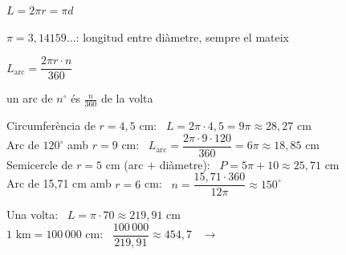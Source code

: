 \documentclass[11pt,a4paper]{article}
\begin{document}
\vfill
\begin{tcbraster}[raster columns=2,raster equal height,raster column skip=10pt]
\begin{tcolorbox}[enhanced,colback=fmyellow!18,colframe=fmgold,arc=4mm,boxrule=1.6pt,before upper=\centering]
{\Large$L=2\pi r=\pi d$}\par\smallskip
{\small $\pi=3{,}14159\dots$: longitud entre diàmetre, sempre el mateix}
\end{tcolorbox}
\begin{tcolorbox}[enhanced,colback=fmyellow!18,colframe=fmgold,arc=4mm,boxrule=1.6pt,before upper=\centering]
{\Large$L_{\text{arc}}=\dfrac{2\pi r\cdot n}{360}$}\par\smallskip
{\small un arc de $n^\circ$ és $\frac{n}{360}$ de la volta}
\end{tcolorbox}
\end{tcbraster}

\vfill
\begin{exemple}[Exemples]
Circumferència de $r=4{,}5$ cm: \ $L=2\pi\cdot4{,}5=9\pi\approx\boxed{28{,}27\text{ cm}}$\\[5pt]
Arc de $120^\circ$ amb $r=9$ cm: \ $L_{\text{arc}}=\dfrac{2\pi\cdot9\cdot120}{360}=6\pi\approx\boxed{18{,}85\text{ cm}}$\\[5pt]
Semicercle de $r=5$ cm (arc $+$ diàmetre): \ $P=5\pi+10\approx\boxed{25{,}71\text{ cm}}$\\[5pt]
Arc de 15,71 cm amb $r=6$ cm: \ $n=\dfrac{15{,}71\cdot360}{12\pi}\approx\boxed{150^\circ}$
\end{exemple}

\vfill
\begin{exemple}
\begin{minipage}[c]{0.2\linewidth}\centering
{}
\end{minipage}\hfill
\begin{minipage}[c]{0.77\linewidth}
Una volta: \ $L=\pi\cdot70\approx219{,}91$ cm\\[3pt]
$1\text{ km}=100\,000$ cm: \ $\dfrac{100\,000}{219{,}91}\approx454{,}7$ \ $\to$ \ 
\end{minipage}
\end{exemple}
\end{document}
